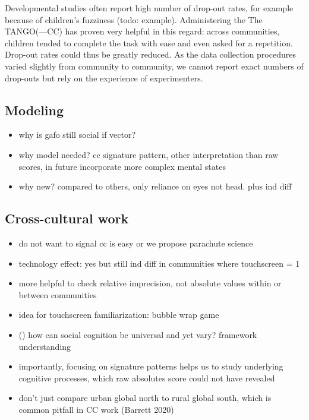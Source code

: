 \documentclass[
]{scrbook}
\providecommand{\tightlist}{%
  \setlength{\itemsep}{0pt}\setlength{\parskip}{0pt}}
\begin{document}
Developmental studies often report high number of drop-out rates, for example because of children's fuzziness (todo: example). Administering the The TANGO(---CC) has proven very helpful in this regard: across communities, children tended to complete the task with ease and even asked for a repetition. Drop-out rates could thus be greatly reduced. As the data collection procedures varied slightly from community to community, we cannot report exact numbers of drop-outs but rely on the experience of experimenters.

\subsection{Modeling}\label{modeling}

\begin{itemize}
\tightlist
\item
  why is gafo still social if vector?
\item
  why model needed? cc signature pattern, other interpretation than raw scores, in future incorporate more complex mental states
\item
  why new? compared to others, only reliance on eyes not head. plus ind diff
\end{itemize}

\subsection{Cross-cultural work}\label{cross-cultural-work}

\begin{itemize}
\tightlist
\item
  do not want to signal cc is easy or we propose parachute science
\item
  technology effect: yes but still ind diff in communities where touchscreen = 1
\item
  more helpful to check relative imprecision, not absolute values within or between communities
\item
  idea for touchscreen familiarization: bubble wrap game
\item
  () how can social cognition be universal and yet vary? framework understanding
\item
  importantly, focusing on signature patterns helps us to study underlying cognitive processes, which raw absolutes score could not have revealed
\item
  don't just compare urban global north to rural global south, which is common pitfall in CC work (Barrett 2020)
\end{itemize}
\end{document}
